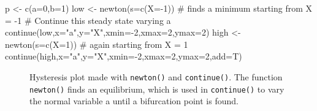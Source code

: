 \documentclass[
  a4paper,
  DIV=11,
  numbers=noendperiod,
  oneside]{scrreprt}
\newenvironment{Shaded}{}{}
\newcommand{\AttributeTok}[1]{\textcolor[rgb]{0.84,0.23,0.29}{#1}}
\newcommand{\CommentTok}[1]{\textcolor[rgb]{0.42,0.45,0.49}{#1}}
\newcommand{\DecValTok}[1]{\textcolor[rgb]{0.00,0.36,0.77}{#1}}
\newcommand{\FunctionTok}[1]{\textcolor[rgb]{0.44,0.26,0.76}{#1}}
\newcommand{\NormalTok}[1]{\textcolor[rgb]{0.14,0.16,0.18}{#1}}
\newcommand{\OtherTok}[1]{\textcolor[rgb]{0.44,0.26,0.76}{#1}}
\newcommand{\SpecialCharTok}[1]{\textcolor[rgb]{0.00,0.36,0.77}{#1}}
\newcommand{\StringTok}[1]{\textcolor[rgb]{0.01,0.18,0.38}{#1}}
\begin{document}
\begin{Shaded}
\begin{Highlighting}[]
\NormalTok{p }\OtherTok{\textless{}{-}} \FunctionTok{c}\NormalTok{(}\AttributeTok{a=}\DecValTok{0}\NormalTok{,}\AttributeTok{b=}\DecValTok{1}\NormalTok{)}
\NormalTok{low }\OtherTok{\textless{}{-}} \FunctionTok{newton}\NormalTok{(}\AttributeTok{s=}\FunctionTok{c}\NormalTok{(}\AttributeTok{X=}\SpecialCharTok{{-}}\DecValTok{1}\NormalTok{)) }\CommentTok{\# finds a minimum starting from X = {-}1}
\CommentTok{\# Continue this steady state varying a}
\FunctionTok{continue}\NormalTok{(low,}\AttributeTok{x=}\StringTok{"a"}\NormalTok{,}\AttributeTok{y=}\StringTok{"X"}\NormalTok{,}\AttributeTok{xmin=}\SpecialCharTok{{-}}\DecValTok{2}\NormalTok{,}\AttributeTok{xmax=}\DecValTok{2}\NormalTok{,}\AttributeTok{ymax=}\DecValTok{2}\NormalTok{) }
\NormalTok{high }\OtherTok{\textless{}{-}} \FunctionTok{newton}\NormalTok{(}\AttributeTok{s=}\FunctionTok{c}\NormalTok{(}\AttributeTok{X=}\DecValTok{1}\NormalTok{)) }\CommentTok{\# again starting from X = 1}
\FunctionTok{continue}\NormalTok{(high,}\AttributeTok{x=}\StringTok{"a"}\NormalTok{,}\AttributeTok{y=}\StringTok{"X"}\NormalTok{,}\AttributeTok{xmin=}\SpecialCharTok{{-}}\DecValTok{2}\NormalTok{,}\AttributeTok{xmax=}\DecValTok{2}\NormalTok{,}\AttributeTok{ymax=}\DecValTok{2}\NormalTok{,}\AttributeTok{add=}\NormalTok{T)}
\end{Highlighting}
\end{Shaded}

\begin{figure}


\caption{\label{fig-ch4n-img3-old-51}Hysteresis plot made with
\texttt{newton()} and \texttt{continue()}. The function
\texttt{newton()} finds an equilibrium, which is used in
\texttt{continue()} to vary the normal variable a until a bifurcation
point is found.}

\end{figure}%
\end{document}
